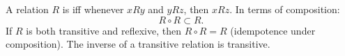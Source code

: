 A relation $R$ is  iff whenever $xRy$ and $yRz$, then $xRz$. In terms of composition:
$$
R \circ R \subset R.
$$
If $R$ is both transitive and reflexive, then $R \circ R = R$ (idempotence under composition). The inverse of a transitive relation is transitive.
